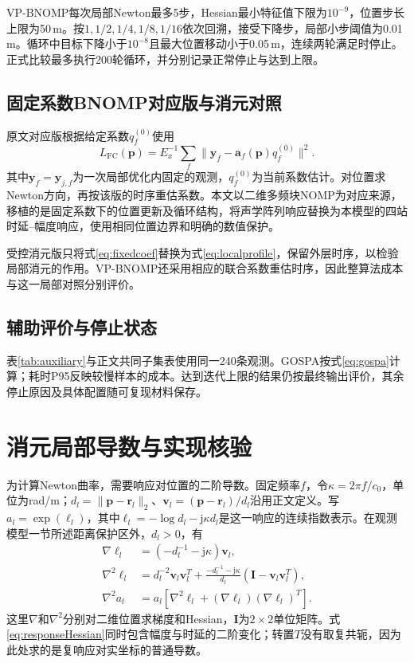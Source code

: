 VP-BNOMP每次局部Newton最多5步，Hessian最小特征值下限为$10^{-9}$，位置步长上限为50\,m。按$1,1/2,1/4,1/8,1/16$依次回溯，接受下降步，局部小步阈值为0.01\,m。循环中目标下降小于$10^{-8}$且最大位置移动小于0.05\,m，连续两轮满足时停止。正式比较最多执行200轮循环，并分别记录正常停止与达到上限。

\subsection{固定系数BNOMP对应版与消元对照}
原文对应版根据给定系数$q_f^{(0)}$使用
\begin{equation}
 L_{\mathrm{FC}}(\bm p)=E_x^{-1}\sum_f
 \|\bm y_f-\bm a_f(\bm p)q_f^{(0)}\|^2 .\label{eq:fixedcoef}
\end{equation}
其中$\bm y_f=\bm y_{j,f}$为一次局部优化内固定的观测，$q_f^{(0)}$为当前系数估计。对位置求Newton方向，再按该版的时序重估系数。本文以二维多频块NOMP\cite{Yang2022}为对应来源，移植的是固定系数下的位置更新及循环结构，将声学阵列响应替换为本模型的四站时延--幅度响应，使用相同位置边界和明确的数值保护。

受控消元版只将式\eqref{eq:fixedcoef}替换为式\eqref{eq:localprofile}，保留外层时序，以检验局部消元的作用。VP-BNOMP还采用相应的联合系数重估时序，因此整算法成本与这一局部对照分别评价。

\subsection{辅助评价与停止状态}
表\ref{tab:auxiliary}与正文共同子集表使用同一240条观测。GOSPA按式\eqref{eq:gospa}计算；耗时P95反映较慢样本的成本。达到迭代上限的结果仍按最终输出评价，其余停止原因及具体配置随可复现材料保存。


\section{消元局部导数与实现核验}\label{app:derivatives}
为计算Newton曲率，需要响应对位置的二阶导数。固定频率$f$，令$\kappa=2\pi f/c_0$，单位为rad/m；$d_l=\|\bm p-\bm r_l\|_2$、$\bm v_l=(\bm p-\bm r_l)/d_l$沿用正文定义。写$a_l=\exp(\ell_l)$，其中$\ell_l=-\log d_l-\mathrm j\kappa d_l$是这一响应的连续指数表示。在观测模型一节所述距离保护区外，$d_l>0$，有
\begin{align}
 \nabla\ell_l&=(-d_l^{-1}-\mathrm j\kappa)\bm v_l,\\
 \nabla^2\ell_l&=d_l^{-2}\bm v_l\bm v_l^T
 +\frac{-d_l^{-1}-\mathrm j\kappa}{d_l}
 (\bm I-\bm v_l\bm v_l^T),\\
 \nabla^2 a_l&=a_l[\nabla^2\ell_l+(\nabla\ell_l)(\nabla\ell_l)^T].\label{eq:responseHessian}
\end{align}
这里$\nabla$和$\nabla^2$分别对二维位置求梯度和Hessian，$\bm I$为$2\times2$单位矩阵。式\eqref{eq:responseHessian}同时包含幅度与时延的二阶变化；转置$T$没有取复共轭，因为此处求的是复响应对实坐标的普通导数。

